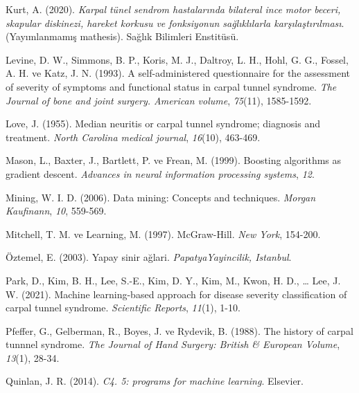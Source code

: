 \documentclass[12pt,twoside]{deuthesis}
\begin{document}
\begin{CSLReferences}{1}{0}
\leavevmode{}%
Kurt, A. (2020). \emph{Karpal tünel sendrom hastalarında bilateral ince motor beceri, skapular diskinezi, hareket korkusu ve fonksiyonun sağlıklılarla karşılaştırılması}. (Yayımlanmamış mathesis). Sağlık Bilimleri Enstitüsü.

\leavevmode{}%
Levine, D. W., Simmons, B. P., Koris, M. J., Daltroy, L. H., Hohl, G. G., Fossel, A. H. ve Katz, J. N. (1993). A self-administered questionnaire for the assessment of severity of symptoms and functional status in carpal tunnel syndrome. \emph{The Journal of bone and joint surgery. American volume}, \emph{75}(11), 1585-1592.

\leavevmode{}%
Love, J. (1955). Median neuritis or carpal tunnel syndrome; diagnosis and treatment. \emph{North Carolina medical journal}, \emph{16}(10), 463-469.

\leavevmode{}%
Mason, L., Baxter, J., Bartlett, P. ve Frean, M. (1999). Boosting algorithms as gradient descent. \emph{Advances in neural information processing systems}, \emph{12}.

\leavevmode{}%
Mining, W. I. D. (2006). Data mining: Concepts and techniques. \emph{Morgan Kaufinann}, \emph{10}, 559-569.

\leavevmode{}%
Mitchell, T. M. ve Learning, M. (1997). McGraw-Hill. \emph{New York}, 154-200.

\leavevmode{}%
Öztemel, E. (2003). Yapay sinir ağlari. \emph{PapatyaYayincilik, Istanbul}.

\leavevmode{}%
Park, D., Kim, B. H., Lee, S.-E., Kim, D. Y., Kim, M., Kwon, H. D., \ldots{} Lee, J. W. (2021). Machine learning-based approach for disease severity classification of carpal tunnel syndrome. \emph{Scientific Reports}, \emph{11}(1), 1-10.

\leavevmode{}%
Pfeffer, G., Gelberman, R., Boyes, J. ve Rydevik, B. (1988). The history of carpal tunnnel syndrome. \emph{The Journal of Hand Surgery: British \& European Volume}, \emph{13}(1), 28-34.

\leavevmode{}%
Quinlan, J. R. (2014). \emph{C4. 5: programs for machine learning}. Elsevier.


\end{CSLReferences}
\end{document}
